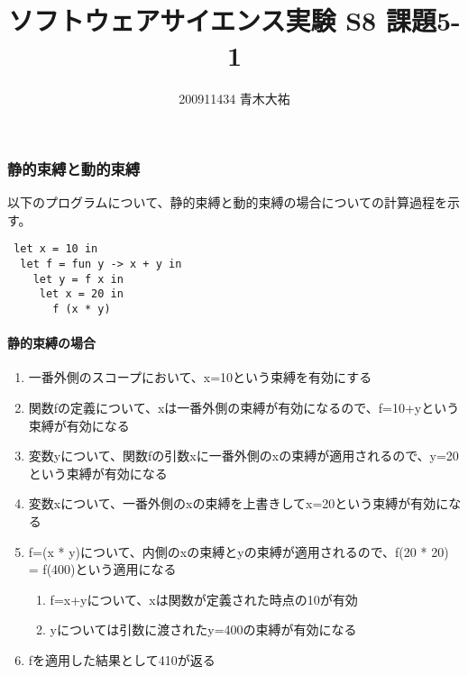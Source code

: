 \documentclass[a4paper,9pt]{jarticle}
\title{ソフトウェアサイエンス実験 S8 課題5-1}
\author{200911434 青木大祐}
\begin{document}
\maketitle
\setcounter{section}{5}
\setcounter{subsection}{1}

\newpage

\subsubsection{静的束縛と動的束縛}
以下のプログラムについて、静的束縛と動的束縛の場合についての計算過程を示
す。

\begin{lstlisting}
 let x = 10 in
  let f = fun y -> x + y in
    let y = f x in 
     let x = 20 in 
       f (x * y)
\end{lstlisting}

\paragraph{静的束縛の場合}

\begin{enumerate}
 \item 一番外側のスコープにおいて、x=10という束縛を有効にする
 \item 関数fの定義について、xは一番外側の束縛が有効になるので、f=10+yという束縛が有効になる
 \item 変数yについて、関数fの引数xに一番外側のxの束縛が適用されるので、y=20という束縛が有効になる
 \item 変数xについて、一番外側のxの束縛を上書きしてx=20という束縛が有効になる
 \item f=(x * y)について、内側のxの束縛とyの束縛が適用されるので、f(20
       * 20) = f(400)という適用になる
       \begin{enumerate}
        \item f=x+yについて、xは関数が定義された時点の10が有効
        \item yについては引数に渡されたy=400の束縛が有効になる
       \end{enumerate}
 \item fを適用した結果として410が返る
\end{enumerate}
\end{document}
